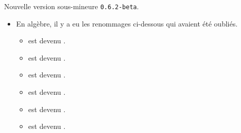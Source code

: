 Nouvelle version sous-mineure \verb+0.6.2-beta+.

\begin{itemize}[itemsep=.5em]
    \item En algèbre, il y a eu les renommages ci-dessous qui avaient été oubliés.
    \begin{itemize}[itemsep=.5em]
        \item {} est devenu .

        \item {} est devenu .

        \item {} est devenu .

        \item {} est devenu .

        \item {} est devenu .

        \item {} est devenu .
    \end{itemize}
\end{itemize}
